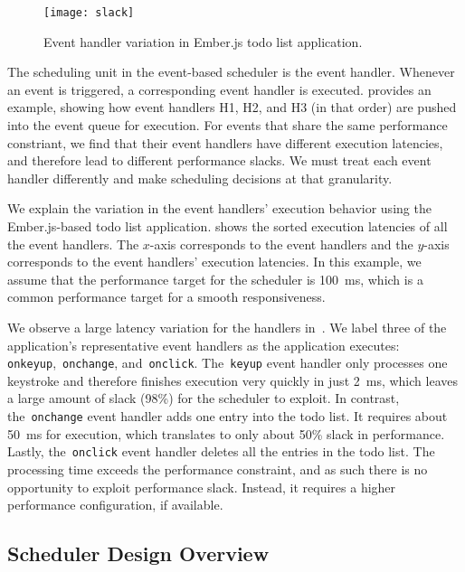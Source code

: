 \begin{figure}[t]
\centering
\texttt{[image: slack]}
\caption{Event handler variation in Ember.js todo list application.}
\label{fig:slack}
\end{figure}

The scheduling unit in the event-based scheduler is the event handler. Whenever an event is triggered, a corresponding event handler is executed.  provides an example, showing how event handlers H1, H2, and H3 (in that order) are pushed into the event queue for execution. For events that share the same performance constriant, we find that their event handlers have different execution latencies, and therefore lead to different performance slacks. We must treat each event handler differently and make scheduling decisions at that granularity.

We explain the variation in the event handlers' execution behavior using the Ember.js-based todo list application.  shows the sorted execution latencies of all the event handlers. The $x$-axis corresponds to the event handlers and the $y$-axis corresponds to the event handlers' execution latencies. In this example, we assume that the performance target for the scheduler is 100~ms, which is a common performance target for a smooth responsiveness.

We observe a large latency variation for the handlers in~. We label three of the application's representative event handlers as the application executes: \texttt{onkeyup},~\texttt{onchange}, and~\texttt{onclick}. The~\texttt{keyup} event handler only processes one keystroke and therefore finishes execution very quickly in just 2~ms, which leaves a large amount of slack (98\%) for the scheduler to exploit. In contrast, the~\texttt{onchange} event handler adds one entry into the todo list. It requires about 50~ms for execution, which translates to only about 50\% slack in performance. Lastly, the~\texttt{onclick} event handler deletes all the entries in the todo list. The processing time exceeds the performance constraint, and as such there is no opportunity to exploit performance slack. Instead, it requires a higher performance configuration, if available.

\subsection{Scheduler Design Overview}
\label{sec:runtime:ebs:overview}

